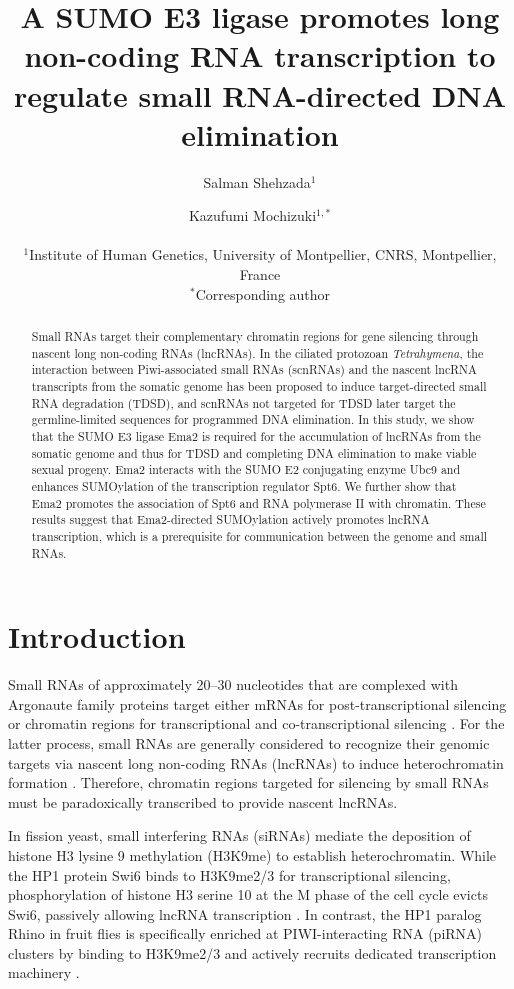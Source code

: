 \documentclass[11pt]{article}
\title{A SUMO E3 ligase promotes long non-coding RNA transcription to regulate small RNA-directed DNA elimination}
\author{
Salman Shehzada$^{1}$ \and Kazufumi Mochizuki$^{1,*}$\\
\\
\small $^{1}$Institute of Human Genetics, University of Montpellier, CNRS, Montpellier, France\\
\small $^{*}$Corresponding author
}
\date{}
\begin{document}
\maketitle

\begin{abstract}
Small RNAs target their complementary chromatin regions for gene silencing through nascent long non-coding RNAs (lncRNAs). In the ciliated protozoan \textit{Tetrahymena}, the interaction between Piwi-associated small RNAs (scnRNAs) and the nascent lncRNA transcripts from the somatic genome has been proposed to induce target-directed small RNA degradation (TDSD), and scnRNAs not targeted for TDSD later target the germline-limited sequences for programmed DNA elimination. In this study, we show that the SUMO E3 ligase Ema2 is required for the accumulation of lncRNAs from the somatic genome and thus for TDSD and completing DNA elimination to make viable sexual progeny. Ema2 interacts with the SUMO E2 conjugating enzyme Ubc9 and enhances SUMOylation of the transcription regulator Spt6. We further show that Ema2 promotes the association of Spt6 and RNA polymerase II with chromatin. These results suggest that Ema2-directed SUMOylation actively promotes lncRNA transcription, which is a prerequisite for communication between the genome and small RNAs.
\end{abstract}

\section{Introduction}

Small RNAs of approximately 20--30 nucleotides that are complexed with Argonaute family proteins target either mRNAs for post-transcriptional silencing or chromatin regions for transcriptional and co-transcriptional silencing \citep{holoch2015}. For the latter process, small RNAs are generally considered to recognize their genomic targets via nascent long non-coding RNAs (lncRNAs) to induce heterochromatin formation \citep{johnson2002,kloc2008}. Therefore, chromatin regions targeted for silencing by small RNAs must be paradoxically transcribed to provide nascent lncRNAs.

In fission yeast, small interfering RNAs (siRNAs) mediate the deposition of histone H3 lysine 9 methylation (H3K9me) to establish heterochromatin. While the HP1 protein Swi6 binds to H3K9me2/3 for transcriptional silencing, phosphorylation of histone H3 serine 10 at the M phase of the cell cycle evicts Swi6, passively allowing lncRNA transcription \citep{chen2008,kloc2008}. In contrast, the HP1 paralog Rhino in fruit flies is specifically enriched at PIWI-interacting RNA (piRNA) clusters by binding to H3K9me2/3 \citep{leThomas2014} and actively recruits dedicated transcription machinery \citep{andersen2017}.
\end{document}
